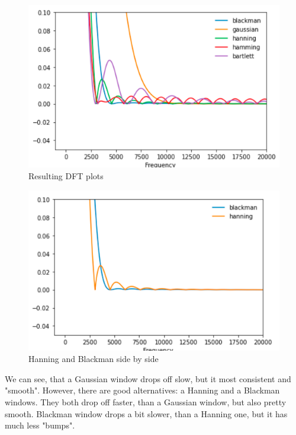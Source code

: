 \documentclass[a4paper]{article}
\begin{document}
        \begin{figure}[H]
            \centering
            \includegraphics[width=\textwidth]{img/p3_2.png}
            \caption{Resulting DFT plots}
            \label{fig:part1_1_2}
        \end{figure}
        
        \begin{figure}[H]
            \centering
            \includegraphics[width=\textwidth]{img/p3_3.png}
            \caption{Hanning and Blackman side by side}
            \label{fig:part1_1_2}
        \end{figure}
        
        We can see, that a Gaussian window drops off slow, but it most consistent and "smooth". However, there are good alternatives: a Hanning and a Blackman windows. They both drop off faster, than a Gaussian window, but also pretty smooth. Blackman window drops a bit slower, than a Hanning one, but it has much less "bumps".
            
\end{document}
